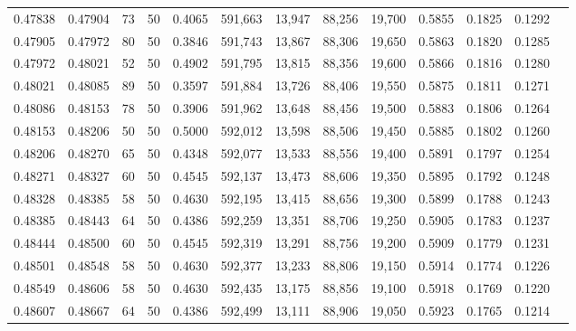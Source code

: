\begin{tabular}{rrrrrrrrrrrrr}
0.47838 & 0.47904 &    73 &  50 &                                     0.4065 & 591,663 &  13,947 &  88,256 &  19,700 & 0.5855 & 0.1825 & 0.1292 \\
0.47905 & 0.47972 &    80 &  50 &                                     0.3846 & 591,743 &  13,867 &  88,306 &  19,650 & 0.5863 & 0.1820 & 0.1285 \\
0.47972 & 0.48021 &    52 &  50 &                                     0.4902 & 591,795 &  13,815 &  88,356 &  19,600 & 0.5866 & 0.1816 & 0.1280 \\
0.48021 & 0.48085 &    89 &  50 &                                     0.3597 & 591,884 &  13,726 &  88,406 &  19,550 & 0.5875 & 0.1811 & 0.1271 \\
0.48086 & 0.48153 &    78 &  50 &                                     0.3906 & 591,962 &  13,648 &  88,456 &  19,500 & 0.5883 & 0.1806 & 0.1264 \\
0.48153 & 0.48206 &    50 &  50 &                                     0.5000 & 592,012 &  13,598 &  88,506 &  19,450 & 0.5885 & 0.1802 & 0.1260 \\
0.48206 & 0.48270 &    65 &  50 &                                     0.4348 & 592,077 &  13,533 &  88,556 &  19,400 & 0.5891 & 0.1797 & 0.1254 \\
0.48271 & 0.48327 &    60 &  50 &                                     0.4545 & 592,137 &  13,473 &  88,606 &  19,350 & 0.5895 & 0.1792 & 0.1248 \\
0.48328 & 0.48385 &    58 &  50 &                                     0.4630 & 592,195 &  13,415 &  88,656 &  19,300 & 0.5899 & 0.1788 & 0.1243 \\
0.48385 & 0.48443 &    64 &  50 &                                     0.4386 & 592,259 &  13,351 &  88,706 &  19,250 & 0.5905 & 0.1783 & 0.1237 \\
0.48444 & 0.48500 &    60 &  50 &                                     0.4545 & 592,319 &  13,291 &  88,756 &  19,200 & 0.5909 & 0.1779 & 0.1231 \\
0.48501 & 0.48548 &    58 &  50 &                                     0.4630 & 592,377 &  13,233 &  88,806 &  19,150 & 0.5914 & 0.1774 & 0.1226 \\
0.48549 & 0.48606 &    58 &  50 &                                     0.4630 & 592,435 &  13,175 &  88,856 &  19,100 & 0.5918 & 0.1769 & 0.1220 \\
0.48607 & 0.48667 &    64 &  50 &                                     0.4386 & 592,499 &  13,111 &  88,906 &  19,050 & 0.5923 & 0.1765 & 0.1214 \\

\end{tabular}
